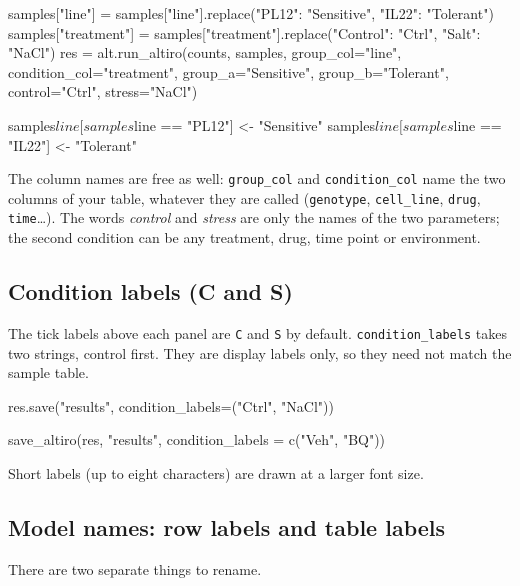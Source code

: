 \documentclass[11pt,a4paper]{article}
\newcommand{\code}[1]{\texttt{\color{navy!85!black}#1}}
\begin{document}
\begin{pycode}
samples["line"] = samples["line"].replace({"PL12": "Sensitive", "IL22": "Tolerant"})
samples["treatment"] = samples["treatment"].replace({"Control": "Ctrl", "Salt": "NaCl"})
res = alt.run_altiro(counts, samples,
                     group_col="line", condition_col="treatment",
                     group_a="Sensitive", group_b="Tolerant",
                     control="Ctrl", stress="NaCl")
\end{pycode}

\begin{rcode}
samples$line[samples$line == "PL12"] <- "Sensitive"
samples$line[samples$line == "IL22"] <- "Tolerant"
\end{rcode}

The column names are free as well: \code{group\_col} and \code{condition\_col} name the two columns
of your table, whatever they are called (\code{genotype}, \code{cell\_line}, \code{drug},
\code{time}\ldots). The words \emph{control} and \emph{stress} are only the names of the two
parameters; the second condition can be any treatment, drug, time point or environment.

\subsection{Condition labels (C and S)}

The tick labels above each panel are \code{C} and \code{S} by default. \code{condition\_labels} takes
two strings, control first. They are display labels only, so they need not match the sample table.

\begin{pycode}
res.save("results", condition_labels=("Ctrl", "NaCl"))
\end{pycode}
\begin{rcode}
save_altiro(res, "results", condition_labels = c("Veh", "BQ"))
\end{rcode}

Short labels (up to eight characters) are drawn at a larger font size.

\subsection{Model names: row labels and table labels}

There are two separate things to rename.
\end{document}

